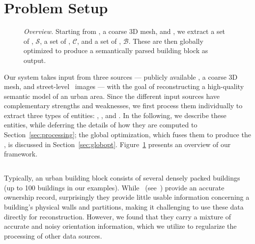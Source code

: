 


\section{Problem Setup}
\label{sec:setup}



\begin{figure}[t!]
    \centering
  \def\svgwidth{1\columnwidth}  
    
    \caption{{\it Overview.} Starting from \GISds, a coarse 3D mesh, and \streetI, we extract a set of \sweepedges, $\mathcal{S}$, a set of \cleanprofiles, $\mathcal{C}$, and a set of \buildingfacades, $\mathcal{B}$. These are then globally optimized to produce a semantically parsed building block as output.}
    \label{fig:setup}
    \vspace*{-.07in}
\end{figure}

Our system takes input from three sources --- publicly available \GISds, a coarse 3D mesh, and street-level \facade\ images --- with the goal of reconstructing a high-quality semantic model of an urban area. 
%
Since the different input sources have complementary strengths and weaknesses, we first process them individually to extract three types of entities: {\em \sweepedges}, {\em \cleanprofiles}, and {\em \buildingfacades}. 
%
In the following, we describe these entities, while deferring the details of how they are computed to Section~\ref{sec:processing}; the global optimization, which fuses them to produce the \outputM, is discussed in Section~\ref{sec:globopt}. Figure~\ref{fig:setup} presents an overview of our framework. 

\subsection{\GISds} 
Typically, an urban building block consists of several densely packed buildings (up to 100 buildings in our examples). 
While \GISds~(see~\cite{osm}) provide an accurate ownership record, 
surprisingly they provide little usable information concerning a building's physical walls and partitions, making it challenging to use these data directly for reconstruction. However, we found that they carry a mixture of accurate and noisy orientation information, which we utilize to regularize the processing of other data sources.


